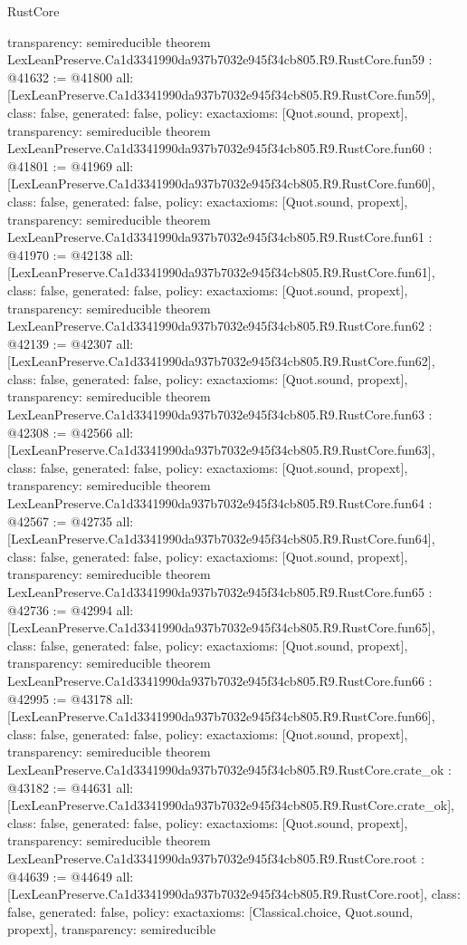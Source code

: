 \begin{lexlean}{RustCore}
\begin{coremodule}
{  transparency: semireducible
}
theorem LexLeanPreserve.Ca1d3341990da937b7032e945f34cb805.R9.RustCore.fun59 : @41632 := @41800 {
  all: [LexLeanPreserve.Ca1d3341990da937b7032e945f34cb805.R9.RustCore.fun59],
  class: false,
  generated: false,
  policy: exact{axioms: [Quot.sound, propext]},
  transparency: semireducible
}
theorem LexLeanPreserve.Ca1d3341990da937b7032e945f34cb805.R9.RustCore.fun60 : @41801 := @41969 {
  all: [LexLeanPreserve.Ca1d3341990da937b7032e945f34cb805.R9.RustCore.fun60],
  class: false,
  generated: false,
  policy: exact{axioms: [Quot.sound, propext]},
  transparency: semireducible
}
theorem LexLeanPreserve.Ca1d3341990da937b7032e945f34cb805.R9.RustCore.fun61 : @41970 := @42138 {
  all: [LexLeanPreserve.Ca1d3341990da937b7032e945f34cb805.R9.RustCore.fun61],
  class: false,
  generated: false,
  policy: exact{axioms: [Quot.sound, propext]},
  transparency: semireducible
}
theorem LexLeanPreserve.Ca1d3341990da937b7032e945f34cb805.R9.RustCore.fun62 : @42139 := @42307 {
  all: [LexLeanPreserve.Ca1d3341990da937b7032e945f34cb805.R9.RustCore.fun62],
  class: false,
  generated: false,
  policy: exact{axioms: [Quot.sound, propext]},
  transparency: semireducible
}
theorem LexLeanPreserve.Ca1d3341990da937b7032e945f34cb805.R9.RustCore.fun63 : @42308 := @42566 {
  all: [LexLeanPreserve.Ca1d3341990da937b7032e945f34cb805.R9.RustCore.fun63],
  class: false,
  generated: false,
  policy: exact{axioms: [Quot.sound, propext]},
  transparency: semireducible
}
theorem LexLeanPreserve.Ca1d3341990da937b7032e945f34cb805.R9.RustCore.fun64 : @42567 := @42735 {
  all: [LexLeanPreserve.Ca1d3341990da937b7032e945f34cb805.R9.RustCore.fun64],
  class: false,
  generated: false,
  policy: exact{axioms: [Quot.sound, propext]},
  transparency: semireducible
}
theorem LexLeanPreserve.Ca1d3341990da937b7032e945f34cb805.R9.RustCore.fun65 : @42736 := @42994 {
  all: [LexLeanPreserve.Ca1d3341990da937b7032e945f34cb805.R9.RustCore.fun65],
  class: false,
  generated: false,
  policy: exact{axioms: [Quot.sound, propext]},
  transparency: semireducible
}
theorem LexLeanPreserve.Ca1d3341990da937b7032e945f34cb805.R9.RustCore.fun66 : @42995 := @43178 {
  all: [LexLeanPreserve.Ca1d3341990da937b7032e945f34cb805.R9.RustCore.fun66],
  class: false,
  generated: false,
  policy: exact{axioms: [Quot.sound, propext]},
  transparency: semireducible
}
theorem LexLeanPreserve.Ca1d3341990da937b7032e945f34cb805.R9.RustCore.crate_ok : @43182 := @44631 {
  all: [LexLeanPreserve.Ca1d3341990da937b7032e945f34cb805.R9.RustCore.crate_ok],
  class: false,
  generated: false,
  policy: exact{axioms: [Quot.sound, propext]},
  transparency: semireducible
}
theorem LexLeanPreserve.Ca1d3341990da937b7032e945f34cb805.R9.RustCore.root : @44639 := @44649 {
  all: [LexLeanPreserve.Ca1d3341990da937b7032e945f34cb805.R9.RustCore.root],
  class: false,
  generated: false,
  policy: exact{axioms: [Classical.choice, Quot.sound, propext]},
  transparency: semireducible
}


\end{coremodule}
\end{lexlean}
